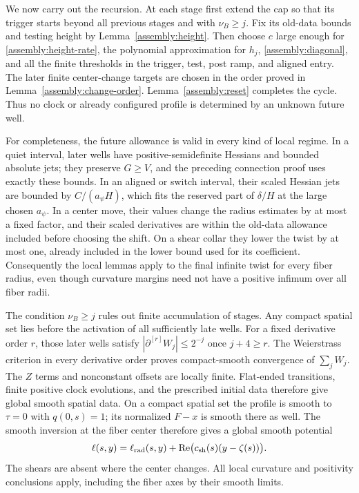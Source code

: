 We now carry out the recursion. At each stage first extend the
cap so that its trigger starts beyond all previous stages and
with $\nu_B\geq j$. Fix its old-data bounds and testing height
by Lemma~\ref{assembly:height}. Then choose $c$ large enough
for \eqref{assembly:height-rate}, the polynomial approximation
for $h_j$, \eqref{assembly:diagonal}, and all the finite
thresholds in the trigger, test, post ramp, and aligned entry.
The later finite center-change targets are chosen in the
order proved in Lemma~\ref{assembly:change-order}.
Lemma~\ref{assembly:reset} completes the cycle.
Thus no clock or already configured profile is determined
by an unknown future well.

For completeness, the future allowance is valid in every
kind of local regime. In a quiet interval, later wells have
positive-semidefinite Hessians and bounded absolute jets;
they preserve $G\geq V$, and the preceding connection proof
uses exactly these bounds. In an aligned or switch interval,
their scaled Hessian jets are bounded by
$C/(a_\psi H)$, which fits the reserved part of
$\delta/H$ at the large chosen $a_\psi$. In a center move,
their values change the radius estimates by at most a fixed
factor, and their scaled derivatives are within the old-data
allowance included before choosing the shift. On a shear
collar they lower the twist by at most one, already included
in the lower bound used for its coefficient. Consequently
the local lemmas apply to the final infinite twist for
every fiber radius, even though curvature margins need not
have a positive infimum over all fiber radii.

The condition $\nu_B\geq j$ rules out finite accumulation of
stages. Any compact spatial set lies before the activation
of all sufficiently late wells. For a fixed derivative order
$r$, those later wells satisfy
$|\partial^{[r]}W_j|\leq2^{-j}$ once $j+4\geq r$.
The Weierstrass criterion in every derivative order proves
compact-smooth convergence of $\sum_jW_j$.
The $Z$ terms and nonconstant offsets are locally finite.
Flat-ended transitions, finite positive clock evolutions,
and the prescribed initial data therefore give global smooth
spatial data. On a compact spatial set the profile is smooth
to $\tau=0$ with $q(0,s)=1$; its normalized $F-x$ is smooth
there as well. The smooth inversion at the fiber center
therefore gives a global smooth potential
\[
 \ell(s,y)=\ell_{\rm rad}(s,y)+
 \operatorname{Re}\bigl(c_{\rm sh}(s)(y-\zeta(s))\bigr).
\]
The shears are absent where the center changes.
All local curvature and positivity conclusions apply,
including the fiber axes by their smooth limits.

